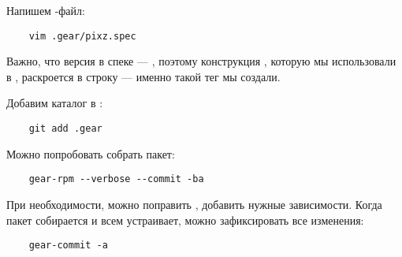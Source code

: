 Напишем -файл:
\begin{verbatim}
	vim .gear/pixz.spec
\end{verbatim} 

Важно, что версия в спеке --- , поэтому конструкция , 
которую мы использовали в , раскроется в строку  --- 
именно такой тег  мы создали. 

Добавим каталог  в :
\begin{verbatim}
	git add .gear
\end{verbatim} 

Можно попробовать собрать пакет: 
\begin{verbatim}
	gear-rpm --verbose --commit -ba
\end{verbatim}

При необходимости, можно поправить , добавить нужные зависимости. 
Когда пакет собирается и всем устраивает, можно зафиксировать все изменения: 
\begin{verbatim}
	gear-commit -a
\end{verbatim}

